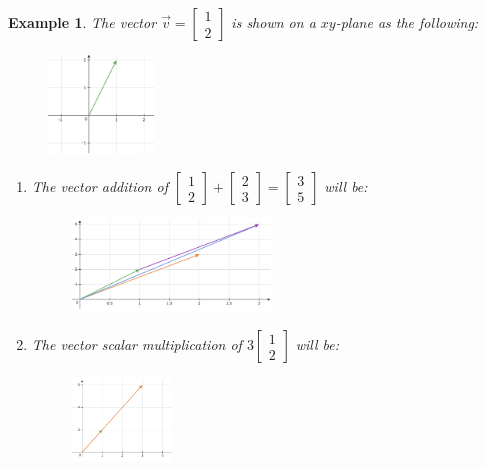 \documentclass[12pt, a4paper]{article}
\newtheorem{eg}{Example}[subsection]
\begin{document}
\begin{eg}
The vector $\vec{v}=\begin{bmatrix}1\\2\end{bmatrix}$ is shown on a $xy$-plane as the following: 
\begin{figure}[H]
\centering
\includegraphics[width=0.25\textwidth]{vector1.png}
\end{figure}
\begin{enumerate}
\item The vector addition of $\begin{bmatrix}1\\2\end{bmatrix}+\begin{bmatrix}2\\3\end{bmatrix}=\begin{bmatrix}3\\5\end{bmatrix}$ will be: 
\begin{figure}[H]
\centering
\includegraphics[width=0.5\textwidth]{vector addition.png} 
\end{figure}
\item The vector scalar multiplication of $3\begin{bmatrix}1\\2\end{bmatrix}$ will be: \begin{figure}[H] 
\centering 
\includegraphics[width=0.25\textwidth]{scalar multiplication.png} 
\end{figure}
\end{enumerate}
\end{eg}
\end{document}

